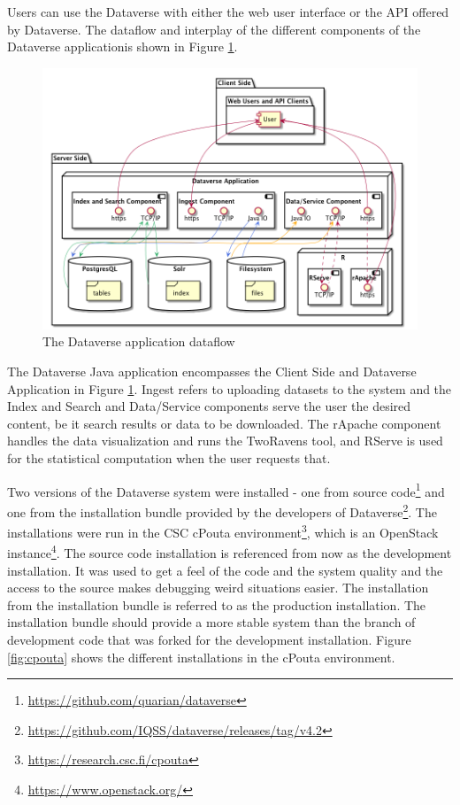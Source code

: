 Users can use the Dataverse
with either the web user interface or the API offered by Dataverse. The
dataflow and interplay of the different components of the Dataverse application is shown in Figure
\ref{fig:dataflow}.

\begin{figure}
    \begin{centering}
        \includegraphics[width=\textwidth]{images/dataflow}
    \end{centering}
    \caption[The Dataverse application dataflow]{The Dataverse application dataflow}
    \label{fig:dataflow}
\end{figure}

The Dataverse Java application encompasses the Client Side and Dataverse
Application in Figure \ref{fig:dataflow}. Ingest refers to uploading datasets
to the system and the Index and Search and Data/Service components serve the
user the desired content, be it search results or data to be downloaded. The
rApache component handles the data visualization and runs the TwoRavens tool,
and RServe is used for the statistical computation when the user requests that.

Two versions of the Dataverse system were installed - one from source
code\footnote{\url{https://github.com/quarian/dataverse}} and one from the
installation bundle provided by the developers of
Dataverse\footnote{\url{https://github.com/IQSS/dataverse/releases/tag/v4.2}}.
The installations were run in the CSC cPouta
environment\footnote{\url{https://research.csc.fi/cpouta}}, which is an
OpenStack instance\footnote{\url{https://www.openstack.org/}}. The source code
installation is referenced from now as the development installation. It
was used to get a feel of the code and the system quality and the access
to the source makes debugging weird situations easier.
The installation from the installation bundle is referred to as the production
installation. The installation bundle should provide a more stable system than the branch of development
code that was forked for the development installation. Figure
\ref{fig:cpouta} shows the different installations in the cPouta environment.

